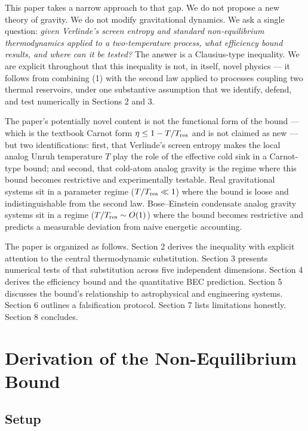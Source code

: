 \documentclass[11pt]{article}
\begin{document}
This paper takes a narrow approach to that gap. We do not propose a new theory of gravity. We do not modify gravitational dynamics. We ask a single question: \emph{given Verlinde's screen entropy and standard non-equilibrium thermodynamics applied to a two-temperature process, what efficiency bound results, and where can it be tested?} The answer is a Clausius-type inequality. We are explicit throughout that this inequality is not, in itself, novel physics --- it follows from combining (1) with the second law applied to processes coupling two thermal reservoirs, under one substantive assumption that we identify, defend, and test numerically in Sections 2 and 3.

The paper's potentially novel content is not the functional form of the bound --- which is the textbook Carnot form \(\eta \leq 1 - T/T_{\rm res}\) and is not claimed as new --- but two identifications: first, that Verlinde's screen entropy makes the local analog Unruh temperature \(T\) play the role of the effective cold sink in a Carnot-type bound; and second, that cold-atom analog gravity is the regime where this bound becomes restrictive and experimentally testable. Real gravitational systems sit in a parameter regime (\(T/T_{\rm res} \ll 1\)) where the bound is loose and indistinguishable from the second law. Bose--Einstein condensate analog gravity systems sit in a regime (\(T/T_{\rm res} \sim O(1)\)) where the bound becomes restrictive and predicts a measurable deviation from naive energetic accounting.

The paper is organized as follows. Section 2 derives the inequality with explicit attention to the central thermodynamic substitution. Section 3 presents numerical tests of that substitution across five independent dimensions. Section 4 derives the efficiency bound and the quantitative BEC prediction. Section 5 discusses the bound's relationship to astrophysical and engineering systems. Section 6 outlines a falsification protocol. Section 7 lists limitations honestly. Section 8 concludes.

\section{Derivation of the Non-Equilibrium Bound}\label{derivation-of-the-non-equilibrium-bound}

\subsection{Setup}\label{setup}
\end{document}
